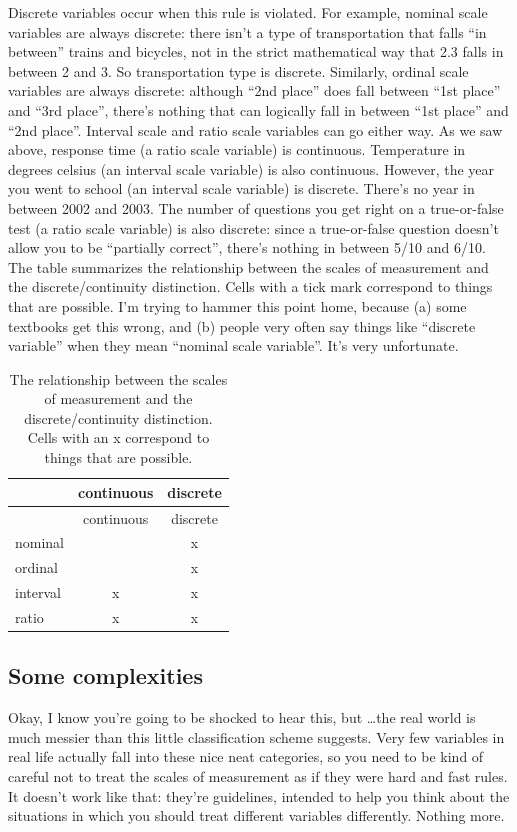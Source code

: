 \documentclass[]{book}
\begin{document}
Discrete variables occur when this rule is violated. For example, nominal scale variables are always discrete: there isn't a type of transportation that falls ``in between'' trains and bicycles, not in the strict mathematical way that 2.3 falls in between 2 and 3. So transportation type is discrete. Similarly, ordinal scale variables are always discrete: although ``2nd place'' does fall between ``1st place'' and ``3rd place'', there's nothing that can logically fall in between ``1st place'' and ``2nd place''. Interval scale and ratio scale variables can go either way. As we saw above, response time (a ratio scale variable) is continuous. Temperature in degrees celsius (an interval scale variable) is also continuous. However, the year you went to school (an interval scale variable) is discrete. There's no year in between 2002 and 2003. The number of questions you get right on a true-or-false test (a ratio scale variable) is also discrete: since a true-or-false question doesn't allow you to be ``partially correct'', there's nothing in between 5/10 and 6/10. The table summarizes the relationship between the scales of measurement and the discrete/continuity distinction. Cells with a tick mark correspond to things that are possible. I'm trying to hammer this point home, because (a) some textbooks get this wrong, and (b) people very often say things like ``discrete variable'' when they mean ``nominal scale variable''. It's very unfortunate.

\begin{longtable}[]{@{}lcc@{}}
\caption{The relationship between the scales of measurement and the discrete/continuity distinction. Cells with an x correspond to things that are possible.}\tabularnewline
\toprule
& continuous & discrete\tabularnewline
\midrule
\endfirsthead
\toprule
& continuous & discrete\tabularnewline
\midrule
\endhead
nominal & & x\tabularnewline
ordinal & & x\tabularnewline
interval & x & x\tabularnewline
ratio & x & x\tabularnewline
\bottomrule
\end{longtable}

\hypertarget{some-complexities}{%
\subsection{Some complexities}\label{some-complexities}}

Okay, I know you're going to be shocked to hear this, but \ldots{}the real world is much messier than this little classification scheme suggests. Very few variables in real life actually fall into these nice neat categories, so you need to be kind of careful not to treat the scales of measurement as if they were hard and fast rules. It doesn't work like that: they're guidelines, intended to help you think about the situations in which you should treat different variables differently. Nothing more.
\end{document}
